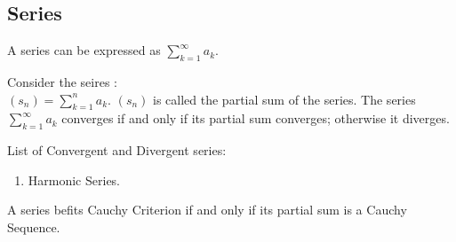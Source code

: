 \documentclass[../note.tex]{subfiles}
\begin{document}
\subsection{Series}
\begin{definition}[Series]
	A series can be expressed as $ \sum^{\infty}_{k=1} a_k$. 
\end{definition}
\begin{definition}
	Consider the seires :\\
	$(s_n)=\sum^{n}_{k=1} a_k$. $(s_n)$ is called the partial sum of the series. The series $\sum^{\infty}_{k=1}a_k $ converges if and only if its partial sum converges; otherwise it diverges. 
\end{definition}
\begin{example}
List of Convergent and Divergent series:
\begin{enumerate}
	\item Harmonic Series.
\end{enumerate}
\end{example}

\begin{definition}A series befits Cauchy Criterion if and only if its partial sum is a Cauchy Sequence. \end{definition}
\end{document}
